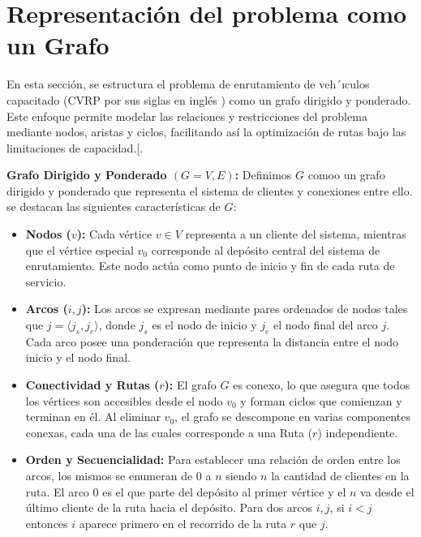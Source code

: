 \documentclass{article}
\begin{document}
\section {Representación del problema como un Grafo}

En esta sección, se estructura el problema de enrutamiento de veh´ıculos capacitado (CVRP por sus siglas en inglés ) como un grafo dirigido y ponderado. Este enfoque permite modelar las relaciones y restricciones del problema mediante nodos, aristas y ciclos, facilitando así la optimización de rutas bajo las limitaciones de capacidad.[.\cite{ref1}

\textbf{Grafo Dirigido y Ponderado $(G = V,E)$:} Definimos $G$ comoo un grafo dirigido y ponderado que representa el sistema de clientes y conexiones entre ello. se destacan las siguientes características de $G$:

\begin{itemize}
    \item \textbf{Nodos ($v$):} Cada vértice $v \in V$ representa a un cliente del sistema, mientras que el vértice especial $v_0$ corresponde al depósito central del sistema de enrutamiento. Este nodo actúa como punto de inicio y fin de cada ruta de servicio.
    
    \item \textbf{Arcos ($i, j$):} Los arcos se expresan mediante pares ordenados de nodos tales que $j = \langle j_s, j_e \rangle$, donde $j_s$ es el nodo de inicio y $j_e$ el nodo final del arco $j$. Cada arco posee una ponderación que representa la distancia entre el nodo inicio y el nodo final.
    
    \item \textbf{Conectividad y Rutas ($r$):} El grafo $G$ es conexo, lo que asegura que todos los vértices son accesibles desde el nodo $v_0$ y forman ciclos que comienzan y terminan en él. Al eliminar $v_0$, el grafo se descompone en varias componentes conexas, cada una de las cuales corresponde a una Ruta ($r$) independiente.
    
    \item \textbf{Orden y Secuencialidad:} Para establecer una relación de orden entre los arcos, los mismos se enumeran de 0 a $n$ siendo $n$ la cantidad de clientes en la ruta. El arco 0 es el que parte del depósito al primer vértice y el $n$ va desde el último cliente de la ruta hacia el depósito. Para dos arcos $i,j$, si $i < j$ entonces $i$ aparece primero en el recorrido de la ruta $r$ que $j$.
\end{itemize}
\end{document}
